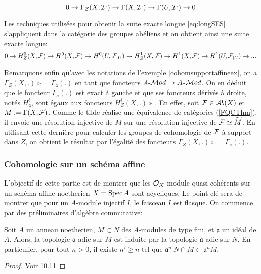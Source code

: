 $$0\rightarrow \Gamma_Z(X,\mathcal{I}^.)\rightarrow \Gamma(X,\mathcal{I}^.)\rightarrow \Gamma(U,\mathcal{I}^.)\rightarrow 0$$

Les techniques utilisées pour obtenir la suite exacte longue \ref{eq:longSES} s'appliquent dans la catégorie des groupes abéliens et on obtient ainsi une suite exacte longue:
\begin{equation}\label{eq:longSESSupport}
0\rightarrow H_Z^0(X,\mathcal{F})\rightarrow H^0(X,\mathcal{F})\rightarrow H^0(U,\mathcal{F}_{|U})\rightarrow  H_Z^1(X,\mathcal{F})\rightarrow H^1(X,\mathcal{F})\rightarrow H^1(U,\mathcal{F}_{|U})\rightarrow ...
\end{equation}


Remarquons enfin qu'avec les notations de l'exemple \ref{cohomsupportaffineex}, on a $\Gamma_Z(X, .)\circ\, \widetilde{}=\Gamma_\mathfrak{a}(.)$ en tant que foncteurs $A$-$\mathcal{M} od\rightarrow A$-$\mathcal{M} od$. On en déduit que le foncteur $\Gamma_\mathfrak{a}(.)$ est exact à gauche et que ses foncteurs dérivés à droite, notés $H_\mathfrak{a}^i$, sont égaux aux foncteurs $H_Z^i(X,.)\circ \widetilde{}$ . En effet, soit $\mathcal{F} \in \mathcal{A} b(X)$ et $M:=\Gamma(X,\mathcal{F})$. Comme le tilde réalise une équivalence de catégories (\ref{FQCThm}), il envoie une résolution injective de $M$ sur une résolution injective de $\mathcal{F}\simeq \widetilde{M}$. En utilisant cette dernière pour calculer les groupes de cohomologie de $\mathcal{F}$ à support dans $Z$, on obtient le résultat par l'égalité des foncteurs $\Gamma_Z(X, .)\circ\, \widetilde{}=\Gamma_\mathfrak{a}(.)$.

\subsubsection{Cohomologie sur un schéma affine}

L'objectif de cette partie est de montrer que les $\mathcal{O}_X$-module quasi-cohérents sur un schéma affine noetherien $X=\operatorname{Spec} A$ sont acycliques. Le point clé sera de montrer que pour un $A$-module injectif $I$, le faisceau $\widetilde{I}$ est flasque. On commence par des préliminaires d'algèbre commutative:

\begin{thm}[de Krull]
Soit $A$ un anneau noetherien, $M\subset N$ des $A$-modules de type fini, et $\mathfrak{a}$ un idéal de $A$. Alors, la topologie $\mathfrak{a}$-adic sur $M$ est induite par la topologie $\mathfrak{a}$-adic sur $N$. En particulier, pour tout $n>0$, il existe $n'\geq n$ tel que $\mathfrak{a}^{n'}N\cap M\subset\mathfrak{a}^nM$.
\end{thm}
\begin{proof}
Voir \cite{atiyahmacdo} 10.11
\end{proof}

